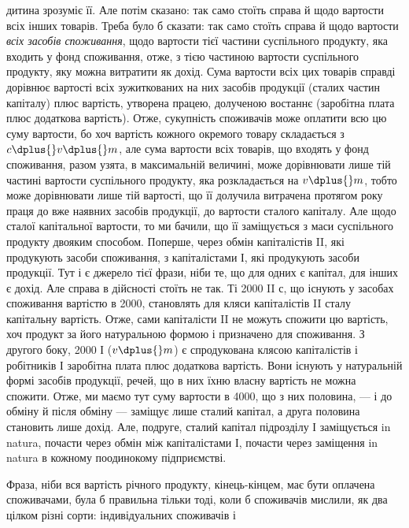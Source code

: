 дитина зрозуміє її. Але потім сказано: так само стоїть справа й щодо
вартости всіх інших товарів. Треба було б сказати: так само стоїть справа
й щодо вартости \emph{всіх засобів споживання}, щодо вартости тієї
частини суспільного продукту, яка входить у фонд споживання, отже, з
тією частиною вартости суспільного продукту, яку можна витратити як
дохід. Сума вартости всіх цих товарів справді дорівнює вартості всіх
зужиткованих на них засобів продукції (сталих частин капіталу) плюс
вартість, утворена працею, долученою востаннє (заробітна плата плюс
додаткова вартість). Отже, сукупність споживачів може оплатити всю цю
суму вартости, бо хоч вартість кожного окремого товару складається
з $c \dplus{} v \dplus{} m$, але сума вартости всіх товарів, що входять у фонд
споживання, разом узята, в максимальній величині, може дорівнювати лише
тій частині вартости суспільного продукту, яка розкладається на $v \dplus{} m$,
тобто може дорівнювати лише тій вартості, що її долучила витрачена
протягом року праця до вже наявних засобів продукції, до вартости сталого
капіталу. Але щодо сталої капітальної вартости, то ми бачили, що
її заміщується з маси суспільного продукту двояким способом. Поперше,
через обмін капіталістів II, які продукують засоби споживання, з капіталістами
І, які продукують засоби продукції. Тут і є джерело тієї фрази,
ніби те, що для одних є капітал, для інших є дохід. Але справа в дійсності
стоїть не так. Ті 2000 II $с$, що існують у засобах споживання вартістю
в 2000, становлять для кляси капіталістів II сталу капітальну вартість.
Отже, сами капіталісти II не можуть спожити цю вартість, хоч продукт
за його натуральною формою і призначено для споживання. З другого
боку, 2000 І ($v \dplus{} m$) є спродукована клясою капіталістів і робітників І
заробітна плата плюс додаткова вартість. Вони існують у натуральній
формі засобів продукції, речей, що в них їхню власну вартість не можна
спожити. Отже, ми маємо тут суму вартости в 4000, що з них половина,
— і до обміну й після обміну — заміщує лише сталий капітал,
а друга половина становить лише дохід. Але, подруге, сталий капітал
підрозділу І заміщується in natura, почасти через обмін між капіталістами
І, почасти через заміщення in natura в кожному поодинокому підприємстві.

Фраза, ніби вся вартість річного продукту, кінець-кінцем, має бути
оплачена споживачами, була б правильна тільки тоді, коли б споживачів
мислили, як два цілком різні сорти: індивідуальних споживачів і
\parbreak{}  %
